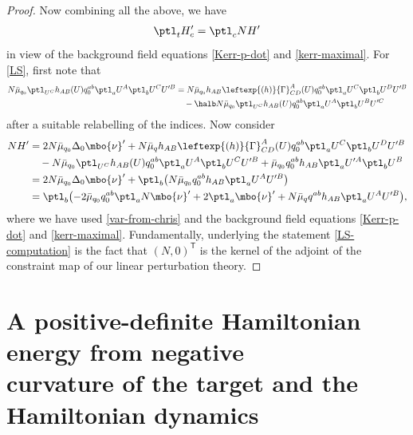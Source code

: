 \begin{proof}
Now combining all the above, we have
\begin{align*}
\ptl_t H'_c = \ptl_c N H'
\end{align*}
in view of the background field equations \eqref{Kerr-p-dot} and \eqref{kerr-maximal}. %
For \eqref{LS}, first note that
\begin{align}
 N \bar{\mu}_{q_0} \ptl_{U^C} h_{AB} (U) q^{ab}_0 \ptl_a U^A \ptl_b U^C U'^B &{}= N \bar{\mu}_{q_0} h_{AB}\leftexp{(h)}{\Gamma}^A_{CD} (U) q^{ab}_0 \ptl_a U^C \ptl_b U^D U'^B \notag\\
 &\quad- \halb N \bar{\mu}_{q_0} \ptl_{U^C} h_{AB}(U) q^{ab}_0 \ptl_a U^A \ptl_b U^B U'^C\label{var-from-chris}
\end{align}
after a suitable relabelling of the indices. Now consider
\begin{align} \label{LS-computation}
N H' &{}= 2N \bar{\mu}_{q_0} \Delta_0 \mbo{\nu}' + N \bar{\mu}_q h_{AB}\leftexp{(h)}{\Gamma}^A_{CD} (U) q^{ab}_0 \ptl_a U^C \ptl_b U^D U'^B \notag\\
&\quad{}- N \bar{\mu}_{q_0} \ptl_{U^C} h_{AB} (U) q^{ab}_0 \ptl_a U^A \ptl_b U^C U'^B + \bar{\mu}_{q_0} q^{ab}_0 h_{AB} \ptl_a U'^A \ptl_b U^B \notag\\
&{}= 2N \bar{\mu}_{q_0} \Delta_0 \mbo{\nu}'+ \ptl_b \bigl(N \bar{\mu}_{q_0} q_0^{ab}h_{AB} \ptl_a U^A U'^B\bigr) \notag\\
&{}= \ptl_b \bigl(-2 \bar{\mu}_{q_0} q_0^{ab} \ptl_a N \mbo{\nu}' + 2 \ptl_a \mbo{\nu}' + N \bar{\mu}_q q^{ab} h_{AB} \ptl_a U^A U'^B\bigr),
\end{align}
where we have used \eqref{var-from-chris} and the background field equations \eqref{Kerr-p-dot} and \eqref{kerr-maximal}.
Fundamentally, underlying the statement \eqref{LS-computation} is the fact that $(N, 0)^{\mathsf{T}}$ is the kernel of the adjoint of the constraint map of our linear perturbation theory.
\end{proof}

\section[A positive-definite Hamiltonian energy from negative curvature of the target\\ and~the~Hamiltonian dynamics]{A positive-definite Hamiltonian energy from negative\\ curvature of the target and the Hamiltonian dynamics}\label{section4}

